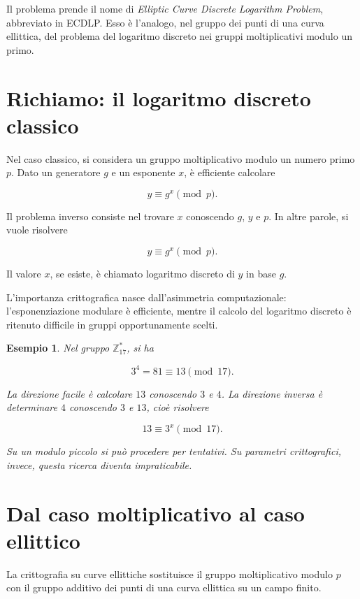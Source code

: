 \documentclass[12pt,a4paper,oneside]{report}
\newtheorem{example}{Esempio}[chapter]
\begin{document}
Il problema prende il nome di \textit{Elliptic Curve Discrete Logarithm Problem}, abbreviato in ECDLP. Esso è l'analogo, nel gruppo dei punti di una curva ellittica, del problema del logaritmo discreto nei gruppi moltiplicativi modulo un primo.

\section{Richiamo: il logaritmo discreto classico}

Nel caso classico, si considera un gruppo moltiplicativo modulo un numero primo \(p\). Dato un generatore \(g\) e un esponente \(x\), è efficiente calcolare

\begin{equation}
    y \equiv g^x \pmod p.
\end{equation}

Il problema inverso consiste nel trovare \(x\) conoscendo \(g\), \(y\) e \(p\). In altre parole, si vuole risolvere

\begin{equation}
    y \equiv g^x \pmod p.
\end{equation}

Il valore \(x\), se esiste, è chiamato logaritmo discreto di \(y\) in base \(g\).

L'importanza crittografica nasce dall'asimmetria computazionale: l'esponenziazione modulare è efficiente, mentre il calcolo del logaritmo discreto è ritenuto difficile in gruppi opportunamente scelti.

\begin{example}
Nel gruppo \(\mathbb{Z}_{17}^{\ast}\), si ha

\[
3^4 = 81 \equiv 13 \pmod{17}.
\]

La direzione facile è calcolare \(13\) conoscendo \(3\) e \(4\). La direzione inversa è determinare \(4\) conoscendo \(3\) e \(13\), cioè risolvere

\[
13 \equiv 3^x \pmod{17}.
\]

Su un modulo piccolo si può procedere per tentativi. Su parametri crittografici, invece, questa ricerca diventa impraticabile.
\end{example}

\section{Dal caso moltiplicativo al caso ellittico}

La crittografia su curve ellittiche sostituisce il gruppo moltiplicativo modulo \(p\) con il gruppo additivo dei punti di una curva ellittica su un campo finito.
\end{document}
